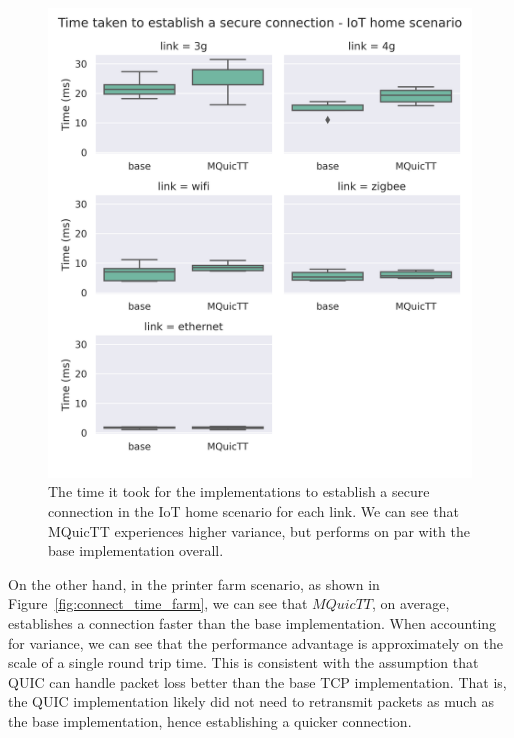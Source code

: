 \begin{figure}
    \centering
    \includegraphics[width=1\linewidth]{images/analysis_connection_time_home.png}
    \caption{The time it took for the implementations to establish a secure connection in the IoT home scenario for each link.
        We can see that MQuicTT experiences higher variance, but performs on par with the base implementation overall.}
    \label{fig:connect_time_home}
\end{figure}

On the other hand, in the printer farm scenario, as shown in Figure~\ref{fig:connect_time_farm}, we can see that $MQuicTT$, on average, establishes a connection faster than the base implementation.
When accounting for variance, we can see that the performance advantage is approximately on the scale of a single round trip time.
This is consistent with the assumption that QUIC can handle packet loss better than the base TCP implementation.
That is, the QUIC implementation likely did not need to retransmit packets as much as the base implementation, hence establishing a quicker connection.

